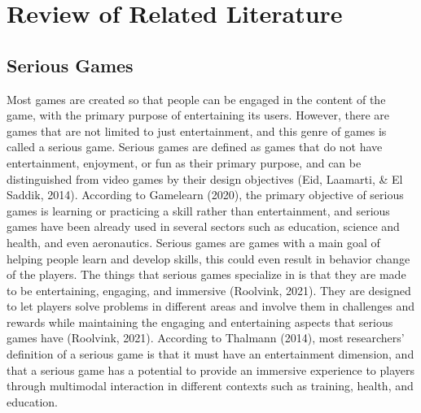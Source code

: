 %
%
%                 

\chapter{Review of Related Literature}
\label{sec:relatedlit}

\section{Serious Games}
Most games are created so that people can be engaged in the content of the game, with the primary purpose of entertaining its users. However, there are games that are not limited to just entertainment, and this genre of games is called a serious game. Serious games are defined as games that do not have entertainment, enjoyment, or fun as their primary purpose, and can be distinguished from video games by their design objectives (Eid, Laamarti, \& El Saddik, 2014). According to Gamelearn (2020), the primary objective of serious games is learning or practicing a skill rather than entertainment, and serious games have been already used in several sectors such as education, science and health, and even aeronautics. Serious games are games with a main goal of helping people learn and develop skills, this could even result in behavior change of the players. The things that serious games specialize in is that they are made to be entertaining, engaging, and immersive (Roolvink, 2021). They are designed to let players solve problems in different areas and involve them in challenges and rewards while maintaining the engaging and entertaining aspects that serious games have (Roolvink, 2021). According to Thalmann (2014), most researchers' definition of a serious game is that it must have an entertainment dimension, and that a serious game has a potential to provide an immersive experience to players through multimodal interaction in different contexts such as training, health, and education.
